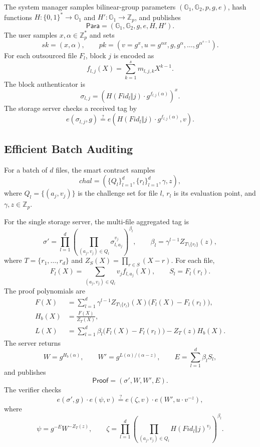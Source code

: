 \documentclass[11pt]{article}
\newcommand{\G}{\mathbb{G}}
\newcommand{\Zp}{\mathbb{Z}_p}
\begin{document}
The system manager samples bilinear-group parameters
\((\G_1,\G_2,p,g,e)\), hash functions \(H:\{0,1\}^\ast\to\G_1\) and
\(H':\G_1\to\Zp\), and publishes
\[
    \mathsf{Para}=(\G_1,\G_2,g,e,H,H').
\]
The user samples \(x,\alpha\in\Zp^\ast\) and sets
\[
    sk=(x,\alpha),\qquad
    pk=(v=g^x,u=g^{\alpha x},g,g^\alpha,\ldots,g^{\alpha^{s-1}}).
\]
For each outsourced file \(F_l\), block \(j\) is encoded as
\[
    f_{l,j}(X)=\sum_{k=1}^{s} m_{l,j,k}X^{k-1}.
\]
The block authenticator is
\[
    \sigma_{l,j}
    =
    \left(H(Fid_l\Vert j)\cdot g^{f_{l,j}(\alpha)}\right)^x .
\]
The storage server checks a received tag by
\[
    e(\sigma_{l,j},g)
    \stackrel{?}{=}
    e\!\left(H(Fid_l\Vert j)\cdot g^{f_{l,j}(\alpha)},v\right).
\]

\subsection{Efficient Batch Auditing}

For a batch of \(d\) files, the smart contract samples
\[
    chal=(\{Q_l\}_{l=1}^{d},\{r_l\}_{l=1}^{d},\gamma,z),
\]
where \(Q_l=\{(a_j,v_j)\}\) is the challenge set for file \(l\), \(r_l\) is its
evaluation point, and \(\gamma,z\in\Zp\).

For the single storage server, the multi-file aggregated tag is
\[
    \sigma'
    =
    \prod_{l=1}^{d}
    \left(
        \prod_{(a_j,v_j)\in Q_l}\sigma_{l,a_j}^{v_j}
    \right)^{\beta_l},
    \qquad
    \beta_l=\gamma^{l-1}Z_{T\setminus\{r_l\}}(z),
\]
where \(T=\{r_1,\ldots,r_d\}\) and \(Z_S(X)=\prod_{r\in S}(X-r)\).  For each
file,
\[
    F_l(X)=\sum_{(a_j,v_j)\in Q_l} v_j f_{l,a_j}(X),
    \qquad
    S_l=F_l(r_l).
\]
The proof polynomials are
\[
\begin{aligned}
    F(X)
    &=
    \sum_{l=1}^{d}\gamma^{l-1}Z_{T\setminus\{r_l\}}(X)
    \bigl(F_l(X)-F_l(r_l)\bigr),\\
    H_b(X)&=\frac{F(X)}{Z_T(X)},\\
    L(X)
    &=
    \sum_{l=1}^{d}\beta_l
    \bigl(F_l(X)-F_l(r_l)\bigr)
    -Z_T(z)H_b(X).
\end{aligned}
\]
The server returns
\[
    W=g^{H_b(\alpha)},\qquad
    W'=g^{L(\alpha)/(\alpha-z)},\qquad
    E=\sum_{l=1}^{d}\beta_l S_l,
\]
and publishes
\[
    \mathsf{Proof}=(\sigma',W,W',E).
\]
The verifier checks
\[
    e(\sigma',g)\cdot e(\psi,v)
    \stackrel{?}{=}
    e(\zeta,v)\cdot e(W',u\cdot v^{-z}),
\]
where
\[
    \psi=g^{-E}W^{-Z_T(z)},\qquad
    \zeta=
    \prod_{l=1}^{d}
    \left(
        \prod_{(a_j,v_j)\in Q_l}H(Fid_l\Vert j)^{v_j}
    \right)^{\beta_l}.
\]
\end{document}
